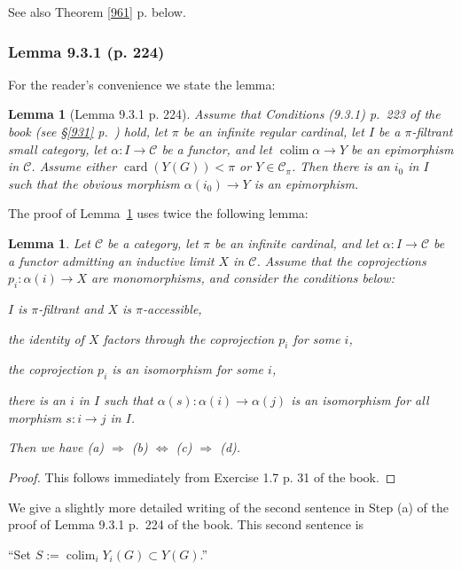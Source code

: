 \documentclass[12pt]{article}
\newtheorem{lem}[thm]{Lemma}
\theoremstyle{remark}
\theoremstyle{definition}
\newcommand{\nn}{\noindent}
\newcommand{\C}{\mathcal C}
\newcommand{\ssi}{\Leftrightarrow}
\newcommand{\then}{\Rightarrow}
\DeclareMathOperator*{\colim}{colim}
\DeclareMathOperator{\card}{card}
\begin{document}
See also Theorem \ref{961} p. \pageref{961} below.

%

\subsubsection{Lemma 9.3.1 (p. 224)}

For the reader's convenience we state the lemma:

\begin{lem}[Lemma 9.3.1 p. 224]\label{l331}
Assume that Conditions (9.3.1) p.~223 of the book (see \S\ref{931} p.~\pageref{931}) hold, let $\pi$ be an infinite regular cardinal, let $I$ be a $\pi$-filtrant small category, let $\alpha:I\to\C$ be a functor, and let $\colim\alpha\to Y$ be an epimorphism in $\C$. Assume either $\card(Y(G))<\pi$ or $Y\in\C_\pi$. Then there is an $i_0$ in $I$ such that the obvious morphism $\alpha(i_0)\to Y$ is an epimorphism.
\end{lem}

The proof of Lemma~\ref{l331} uses twice the following lemma:

\begin{lem}\label{ppi} 
Let $\C$ be a category, let $\pi$ be an infinite cardinal, and let $\alpha:I\to\C$ be a functor admitting an inductive limit $X$ in $\C$. Assume that the coprojections $p_i:\alpha(i)\to X$ are monomorphisms, and consider the conditions below:

\nn{\em(a)} $I$ is $\pi$-filtrant and $X$ is $\pi$-accessible,

\nn{\em(b)} the identity of $X$ factors through the coprojection $p_i$ for some $i$,

\nn{\em(c)} the coprojection $p_i$ is an isomorphism for some $i$,

\nn{\em(d)} there is an $i$ in $I$ such that $\alpha(s):\alpha(i)\to\alpha(j)$ is an isomorphism for all morphism $s:i\to j$ in $I$.

\nn Then we have {\em(a)} $\then$ {\em(b)} $\ssi$ {\em(c)} $\then$ {\em(d)}. 
\end{lem}

\begin{proof}
This follows immediately from Exercise 1.7 p. 31 of the book.
\end{proof}

We give a slightly more detailed writing of the second sentence in Step (a) of the proof of Lemma 9.3.1 p.~224 of the book. This second sentence is 

``Set $S:=\colim_iY_i(G)\subset Y(G)$.'' 
\end{document}
